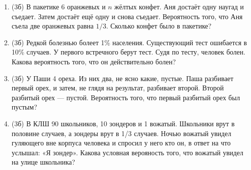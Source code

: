 \documentclass[a4paper, 12pt]{article}
\begin{document}
\begin{enumerate}
\item (3б) В пакетике 6 оранжевых и $n$ жёлтых конфет. Аня достаёт одну наугад и съедает. Затем достаёт ещё одну и снова съедает. Вероятность того, что Аня съела две оранжевых равна $1/3$. Сколько конфет было в пакетике?
\item (3б) Редкой болезнью болеет 1\% населения. Существующий тест ошибается в 10\% случаев. У первого встречного берут тест. Судя по тесту, человек болен. Какова вероятность того, что он действительно болен?
\item (3б) У Паши 4 ореха. Из них два, не ясно какие, пустые. Паша разбивает первый орех, и затем, не глядя на результат, разбивает второй. Второй разбитый орех — пустой. Вероятность того, что первый разбитый орех был пустым?
\item (3б) В КЛШ 90 школьников, 10 зондеров и 1 вожатый. Школьники врут
в половине случаев, а зондеры врут в 1/3 случаев. Ночью вожатый увидел
гуляющего вне корпуса человека и спросил у него кто он,
в ответ на что услышал: «Я зондер».
Какова условная верояность того, что вожатый увидел на улице школьника?
\end{enumerate}
\end{document}
